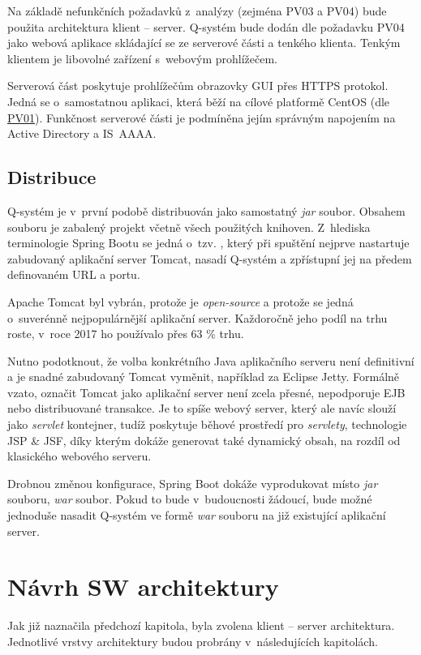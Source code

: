 \documentclass[thesis=M,czech]{FITthesis}[2019/12/23]
\begin{document}
Na základě nefunkčních požadavků z~analýzy (zejména PV03 a PV04) bude použita architektura klient -- server. Q-systém bude dodán dle požadavku PV04 jako webová aplikace skládající se ze serverové části a tenkého klienta. Tenkým klientem je libovolné zařízení s~webovým prohlížečem.

Serverová část poskytuje prohlížečům obrazovky GUI přes HTTPS protokol. Jedná se o~samostatnou aplikaci, která běží na cílové platformě CentOS (dle \hyperref[NefunkcniPozadavky]{PV01}). Funkčnost serverové části je podmíněna jejím správným napojením na Active Directory a IS~AAAA.

\subsection{Distribuce}
Q-systém je v~první podobě distribuován jako samostatný \textit{jar} soubor. Obsahem souboru je zabalený projekt včetně všech použitých knihoven. Z~hlediska terminologie Spring Bootu se jedná o~tzv. , který při spuštění nejprve nastartuje zabudovaný aplikační server Tomcat, nasadí Q-systém a zpřístupní jej na předem definovaném URL a portu. \cite{FatJar}

Apache Tomcat byl vybrán, protože je \textit{open-source} a protože se jedná o~suverénně nejpopulárnější aplikační server. Každoročně jeho podíl na trhu roste, v~roce 2017 ho používalo přes 63 \% trhu. \cite{ApplicationServers}

Nutno podotknout, že volba konkrétního Java aplikačního serveru není definitivní a je snadné zabudovaný Tomcat vyměnit, například za Eclipse Jetty. Formálně vzato, označit Tomcat jako aplikační server není zcela přesné, nepodporuje EJB nebo distribuované transakce. Je to spíše webový server, který ale navíc slouží jako \textit{servlet} kontejner, tudíž poskytuje běhové prostředí pro \textit{servlety}, technologie JSP \& JSF, díky kterým dokáže generovat také dynamický obsah, na rozdíl od klasického webového serveru. \cite{Tomcat}

Drobnou změnou konfigurace, Spring Boot dokáže vyprodukovat místo \textit{jar} souboru, \textit{war} soubor. Pokud to bude v~budoucnosti žádoucí, bude možné jednoduše nasadit Q-systém ve formě \textit{war} souboru na již existující aplikační server.

\newpage
\section{Návrh SW architektury}
Jak již naznačila předchozí kapitola, byla zvolena klient -- server architektura. Jednotlivé vrstvy architektury budou probrány v~následujících kapitolách.
\end{document}
